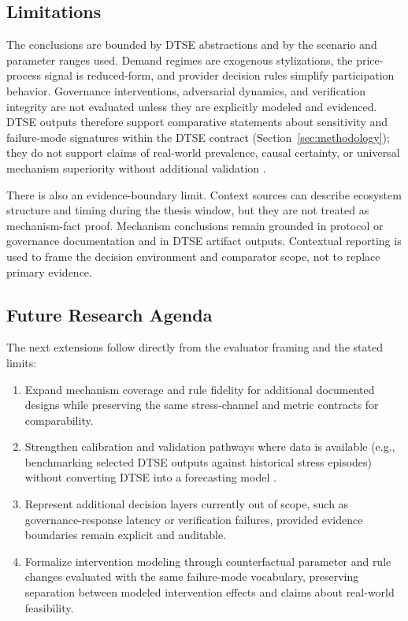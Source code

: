 \subsection{Limitations}
The conclusions are bounded by DTSE abstractions and by the scenario and parameter ranges used. Demand regimes are exogenous stylizations, the price-process signal is reduced-form, and provider decision rules simplify participation behavior. Governance interventions, adversarial dynamics, and verification integrity are not evaluated unless they are explicitly modeled and evidenced. DTSE outputs therefore support comparative statements about sensitivity and failure-mode signatures within the DTSE contract (Section~\ref{sec:methodology}); they do not support claims of real-world prevalence, causal certainty, or universal mechanism superiority without additional validation \cite{Morris2019, Braakman2022}.

There is also an evidence-boundary limit. Context sources can describe ecosystem structure and timing during the thesis window, but they are not treated as mechanism-fact proof. Mechanism conclusions remain grounded in protocol or governance documentation and in DTSE artifact outputs. Contextual reporting is used to frame the decision environment and comparator scope, not to replace primary evidence.

\subsection{Future Research Agenda}
\label{subsec:future_research_agenda}
The next extensions follow directly from the evaluator framing and the stated limits:
\begin{enumerate}
    \item Expand mechanism coverage and rule fidelity for additional documented designs while preserving the same stress-channel and metric contracts for comparability.
    \item Strengthen calibration and validation pathways where data is available (e.g., benchmarking selected DTSE outputs against historical stress episodes) without converting DTSE into a forecasting model \cite{McCulloch2022, Collins2024}.
    \item Represent additional decision layers currently out of scope, such as governance-response latency or verification failures, provided evidence boundaries remain explicit and auditable.
    \item Formalize intervention modeling through counterfactual parameter and rule changes evaluated with the same failure-mode vocabulary, preserving separation between modeled intervention effects and claims about real-world feasibility.
\end{enumerate}

